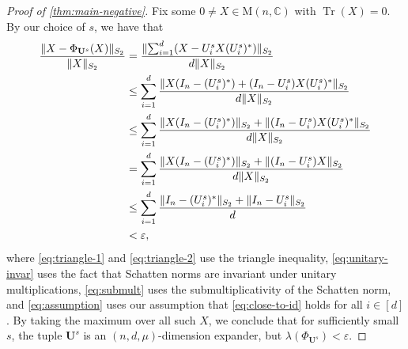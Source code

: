 \documentclass{toc}
\theoremstyle{plain}
\numberwithin{equation}{section}
\theoremstyle{definition}
\newcommand{\bC}{\mathbb{C}}
\DeclareMathOperator{\trace}{Tr}
\newcommand{\norm}[1]{\lVert#1\rVert}
\newcommand{\M}{\mathrm{M}}
\newcommand{\tuple}[1]{\mathbf{#1}}
\newcommand{\vU}{\tuple{U}}
\begin{document}
\begin{proof}[Proof of \cref{thm:main-negative}]
    Fix some $0 \neq X \in \M(n,\bC)$ with $\trace(X) =0$. By our choice of $s$, we have that
    \begingroup
    \allowdisplaybreaks
    \begin{align}
    \frac{\|X-\Phi_{\vU^s}(X)\|_{S_2}}{\norm{X}_{S_2}}
    &=\frac{\norm{\sum_{i=1}^{d}(X-U_i^s X(U_i^s)^*)}_{S_2}}{d\norm{X}_{S_2}} \notag\\
    &\leq\sum_{i=1}^{d}\frac{\norm{X(I_n-(U_i^s)^*)+(I_n-U_i^s)X(U_i^s)^*}_{S_2}}{d\norm{X}_{S_2}} \label{eq:triangle-1}\\
    &\leq\sum_{i=1}^{d}\frac{\norm{X(I_n-(U_i^s)^*)}_{S_2}+\norm{(I_n-U_i^s)X(U_i^s)^*}_{S_2}}{d\norm{X}_{S_2}}\label{eq:triangle-2}\\
    &=\sum_{i=1}^{d}\frac{\norm{X(I_n-(U_i^s)^*)}_{S_2} + \norm{(I_n-U_i^s)X}_{S_2}}{d\norm{X}_{S_2}}\label{eq:unitary-invar}\\
    &\leq \sum_{i=1}^d \frac{\norm{I_n-(U_i^s)^*}_{S_2} + \norm{I_n-U_i^s}_{S_2}}{d} \label{eq:submult}\\
    &<\varepsilon, \label{eq:assumption}
    \end{align}
    \endgroup
    where \eqref{eq:triangle-1} and \eqref{eq:triangle-2} use the triangle inequality, \eqref{eq:unitary-invar} uses the fact that Schatten norms are invariant under unitary multiplications, \eqref{eq:submult} uses the submultiplicativity of the Schatten norm, and \eqref{eq:assumption} uses our assumption that \eqref{eq:close-to-id} holds for all $i \in [d]$. By taking the maximum over all such $X$, we conclude that for sufficiently small $s$, the tuple $\vU^s$ is an $(n,d,\mu)$-dimension expander, but $\lambda(\Phi_{\vU^s}) < \varepsilon$.
\end{proof}
\end{document}
